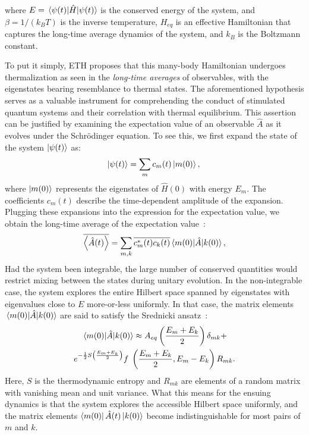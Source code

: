 \documentclass[%
reprint,
superscriptaddress,
amsmath,amssymb,
aps,
prb,
showkeys,
]{revtex4-2}
\begin{document}
where $E=\expval{\hat{H}}{\psi(t)}$ is the conserved energy of the system, and $\beta = 1/(k_B T)$ is the inverse temperature, $H_{eq}$ is an effective Hamiltonian that captures the long-time average dynamics of the system, and $k_B$ is the Boltzmann constant.

To put it simply, ETH proposes that this many-body Hamiltonian undergoes thermalization as seen in the \textit{long-time averages} of observables, with the eigenstates bearing resemblance to thermal states. The aforementioned hypothesis serves as a valuable instrument for comprehending the conduct of stimulated quantum systems and their correlation with thermal equilibrium. This assertion can be justified by examining the expectation value of an observable $\hat{A}$ as it evolves under the Schr\"odinger equation. To see this, we first expand the state of the system $\ket{\psi(t)}$ as:
\begin{equation*}
\ket{\psi(t)} =  \sum_m c_m(t)\ket{m(0)},\\ 
\end{equation*}
where $\ket{m(0)}$ represents the eigenstates of $\hat{H}(0)$ with energy $E_m$. The coefficients $c_m (t)$ describe the time-dependent amplitude of the expansion.
Plugging these expansions into the expression for the expectation value, we obtain the long-time average of the expectation value~\cite{abanin_colloquium_2019}:
\begin{equation}
	\overline{\expval{\hat{A}(t)}} 
	= \sum_{m,k} \overline{c_m^\ast(t) c_k(t)}
	\mel{m(0)}{\hat{A}}{k(0)},
\end{equation}
Had the system been integrable, the large number of conserved quantities would restrict mixing between the states during unitary evolution. In the non-integrable case,
the system explores the entire Hilbert space spanned by eigenstates with eigenvalues close to $E$ more-or-less uniformly. In that case, the matrix elements $\mel{m(0)}{\hat{A}}{k(0)}$ are said to satisfy the Srednicki ansatz~\cite{Srednicki1994,Srednicki_1999}:
\begin{multline}
	\mel{m(0)}{\hat{A}}{k(0)} \approx A_{eq}\left(\frac{E_m+E_k}{2}\right) \delta_{mk} +\\ e^{-\frac12 S\left(\frac{E_m+E_k}{2}\right)} f\;\left(\frac{E_m+E_k}{2}, E_m-E_k\right)R_{mk}.
\end{multline}
Here, $S$ is the thermodynamic entropy and $R_{mk}$ are elements of a random matrix with vanishing mean and unit variance. What this means for the ensuing dynamics is that the system explores the accessible Hilbert space uniformly,  and the matrix elements $\bra{m(0)}\hat{A}(t)\ket{k(0)}$ become indistinguishable for most pairs of $m$ and $k$.
\end{document}

